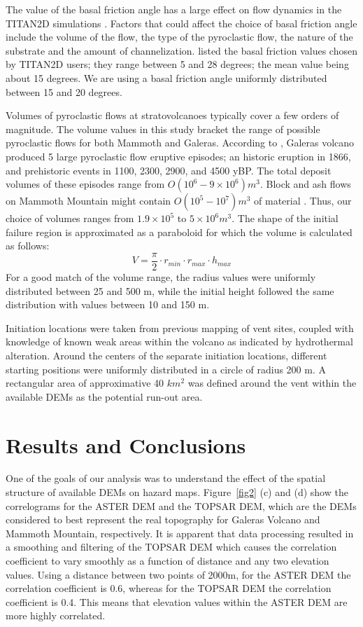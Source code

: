\documentclass[12pt]{article}
\begin{document}
The value of the basal friction angle has a large effect on flow
dynamics in the TITAN2D simulations \citep{Patra2005,
  stinton_2006}. Factors that could affect the choice of basal
friction angle include the volume of the flow, the type of the pyroclastic
flow, the nature of the substrate and the amount of
channelization. \citet{murcia_2010} listed the basal friction values
chosen by TITAN2D users; they range between 5 and 28 degrees; the mean
value being about 15 degrees. We are using a basal friction angle
uniformly distributed between 15 and 20 degrees.
 
Volumes of pyroclastic flows at stratovolcanoes typically cover a few
orders of magnitude. The volume values in this study bracket the range
of possible pyroclastic flows for both Mammoth and Galeras.  According
to \citet{calvache_1990a}, Galeras volcano produced 5 large
pyroclastic flow eruptive episodes; an historic eruption in 1866, and
prehistoric events in 1100, 2300, 2900, and 4500 yBP.  The total
deposit volumes of these episodes range from $O(10^6 - 9\times 10^6)
m^3$.  Block and ash flows on Mammoth Mountain might contain $O(10^5 -
10^7) m^3$ of material \citep{Patra2005, Burkett2007}.  Thus, our
choice of volumes ranges from $1.9 \times 10^5$ to $5 \times 10^6
m^3$.  The shape of the initial failure region is approximated as a
paraboloid for which the volume is calculated as follows:
\begin{equation}
 V=\frac{\pi}{2}\cdot r_{min}\cdot r_{max} \cdot h_{max}
\label{eq:three}
\end{equation}
For a good match of the volume range, the radius values were uniformly
distributed between 25 and 500 m, while the initial height followed
the same distribution with values between 10 and 150 m.

Initiation locations were taken from previous mapping of vent sites,
coupled with knowledge of known weak areas within the volcano as
indicated by hydrothermal alteration.  Around the centers of the
separate initiation locations, different starting positions were
uniformly distributed in a circle of radius 200 m.  A rectangular area
of approximative 40 $km^2$ was defined around the vent within the
available DEMs as the potential run-out area.

\section{Results and Conclusions}

One of the goals of our analysis was to understand the effect of the
spatial structure of available DEMs on hazard maps. Figure~\ref{fig2}
(c) and (d) show the correlograms for the ASTER DEM and the TOPSAR
DEM, which are the DEMs considered to best represent the real
topography for Galeras Volcano and Mammoth Mountain, respectively. It
is apparent that data processing resulted in a smoothing and filtering
of the TOPSAR DEM which causes the correlation coefficient to vary
smoothly as a function of distance and any two elevation values.
Using a distance between two points of 2000m, for the ASTER DEM the
correlation coefficient is 0.6, whereas for the TOPSAR DEM the
correlation coefficient is 0.4. This means that elevation values
within the ASTER DEM are more highly correlated.
\end{document}
